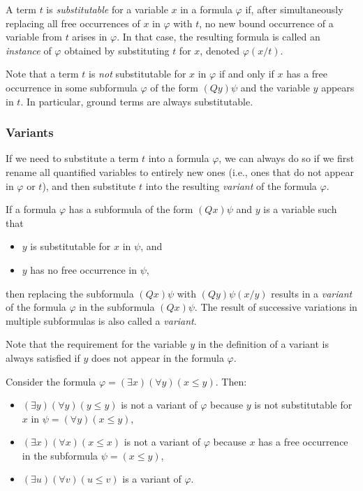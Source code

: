 \begin{definition}
    A term $t$ is \emph{substitutable} for a variable $x$ in a formula $\varphi$ if, after simultaneously replacing all free occurrences of $x$ in $\varphi$ with $t$, no new bound occurrence of a variable from $t$ arises in $\varphi$. In that case, the resulting formula is called an \emph{instance} of $\varphi$ obtained by substituting $t$ for $x$, denoted $\varphi(x/t)$.
\end{definition}

\begin{remark}
    Note that a term $t$ is \emph{not} substitutable for $x$ in $\varphi$ if and only if $x$ has a free occurrence in some subformula $\varphi$ of the form $(Qy)\psi$ and the variable $y$ appears in $t$. In particular, ground terms are always substitutable.
\end{remark}


\subsubsection{Variants}

If we need to substitute a term $t$ into a formula $\varphi$, we can always do so if we first rename all quantified variables to entirely new ones (i.e., ones that do not appear in $\varphi$ or $t$), and then substitute $t$ into the resulting \emph{variant} of the formula $\varphi$.

\begin{definition}[Variant]
   If a formula $\varphi$ has a subformula of the form $(Qx)\psi$ and $y$ is a variable such that
   \begin{itemize}
    \item $y$ is substitutable for $x$ in $\psi$, and
    \item $y$ has no free occurrence in $\psi$,
   \end{itemize} 
then replacing the subformula $(Qx)\psi$ with $(Qy)\psi(x/y)$ results in a \emph{variant} of the formula $\varphi$ in the subformula $(Qx)\psi$. The result of successive variations in multiple subformulas is also called a \emph{variant}.
\end{definition}

Note that the requirement for the variable $y$ in the definition of a variant is always satisfied if $y$ does not appear in the formula $\varphi$.

\begin{example}
    Consider the formula $\varphi=(\exists x)(\forall y)(x\leq y)$. Then:
\begin{itemize}
    \item $(\exists y)(\forall y)(y\leq y)$ is not a variant of $\varphi$ because $y$ is not substitutable for $x$ in $\psi=(\forall y)(x\leq y)$,
    \item $(\exists x)(\forall x)(x\leq x)$ is not a variant of $\varphi$ because $x$ has a free occurrence in the subformula $\psi=(x\leq y)$,
    \item $(\exists u)(\forall v)(u\leq v)$ is a variant of $\varphi$.
\end{itemize}   
\end{example}

